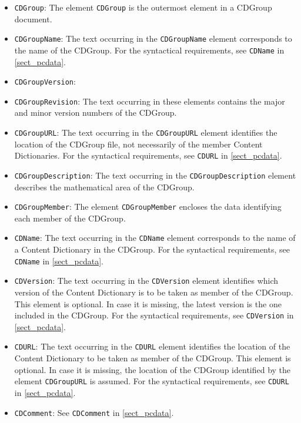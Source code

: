 \begin{itemize}
\item \lstinline|CDGroup|: The \XML element \lstinline|CDGroup| is the outermost element
  in a CDGroup document.
\item \lstinline|CDGroupName|: The text occurring in the \lstinline|CDGroupName| element
  corresponds to the name of the CDGroup. For the syntactical requirements, see
  \lstinline|CDName| in \ref{sect_pcdata}.
\item \lstinline|CDGroupVersion|:
\item \lstinline|CDGroupRevision|: The text occurring in these elements contains the
  major and minor version numbers of the CDGroup.
\item \lstinline|CDGroupURL|: The text occurring in the \lstinline|CDGroupURL| element
  identifies the location of the CDGroup file, not necessarily of the member Content
  Dictionaries. For the syntactical requirements, see \lstinline|CDURL| in
  \ref{sect_pcdata}.
\item \lstinline|CDGroupDescription|: The text occurring in the
  \lstinline|CDGroupDescription| element describes the mathematical area of the CDGroup.
\item \lstinline|CDGroupMember|: The \XML element \lstinline|CDGroupMember| encloses the
  data identifying each member of the CDGroup.
\item \lstinline|CDName|: The text occurring in the \lstinline|CDName| element
  corresponds to the name of a Content Dictionary in the CDGroup. For the syntactical
  requirements, see \lstinline|CDName| in \ref{sect_pcdata}.
\item \lstinline|CDVersion|: The text occurring in the \lstinline|CDVersion| element
  identifies which version of the Content Dictionary is to be taken as member of the
  CDGroup. This element is optional. In case it is missing, the latest version is the one
  included in the CDGroup.  For the syntactical requirements, see \lstinline|CDVersion|
  in \ref{sect_pcdata}.
\item \lstinline|CDURL|: The text occurring in the \lstinline|CDURL| element identifies
  the location of the Content Dictionary to be taken as member of the CDGroup. This
  element is optional. In case it is missing, the location of the CDGroup identified by
  the element \lstinline|CDGroupURL| is assumed.  For the syntactical requirements, see
  \lstinline|CDURL| in \ref{sect_pcdata}.
\item \lstinline|CDComment|: See \lstinline|CDComment| in \ref{sect_pcdata}.
\end{itemize}

